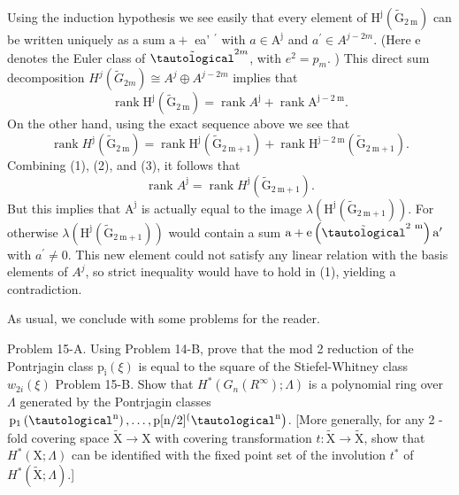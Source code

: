 \documentclass[10pt]{article}
\begin{document}
Using the induction hypothesis we see easily that every element of $\mathrm{H}^{\mathrm{j}}\left(\widetilde{\mathrm{G}}_{2 \mathrm{~m}}\right)$ can be written uniquely as a sum $\mathrm{a}+$ ea' $^{\prime}$ with $a \in \mathrm{A}^{\mathrm{j}}$ and $a^{\prime} \in A^{j-2 m}$. (Here e denotes the Euler class of $\tilde{\tautological}^{2 m}$, with $e^{2}=p_{m} .$ ) This direct sum decomposition $H^{j}\left(\widetilde{G}_{2 m}\right) \cong A^{j} \oplus A^{j-2 m}$ implies that
$$
\operatorname{rank} \mathrm{H}^{\mathrm{j}}\left(\widetilde{\mathrm{G}}_{2 \mathrm{~m}}\right)=\operatorname{rank} A^{\mathrm{j}}+\operatorname{rank} \mathrm{A}^{\mathrm{j}-2 \mathrm{~m}} .
$$
On the other hand, using the exact sequence above we see that
$$
\operatorname{rank} H^{\mathrm{j}}\left(\widetilde{\mathrm{G}}_{2 \mathrm{~m}}\right)=\operatorname{rank} \mathrm{H}^{\mathrm{j}}\left(\widetilde{\mathrm{G}}_{2 \mathrm{~m}+1}\right)+\operatorname{rank} \mathrm{H}^{\mathrm{j}-2 \mathrm{~m}}\left(\widetilde{\mathrm{G}}_{2 \mathrm{~m}+1}\right) .
$$
Combining (1), (2), and (3), it follows that
$$
\operatorname{rank} A^{\mathrm{j}}=\operatorname{rank} H^{\mathrm{j}}\left(\widetilde{\mathrm{G}}_{2 \mathrm{~m}+1}\right) .
$$
But this implies that $\mathrm{A}^{\mathrm{j}}$ is actually equal to the image $\lambda\left(\mathrm{H}^{\mathrm{j}}\left(\tilde{\mathrm{G}}_{2 \mathrm{~m}+1}\right)\right)$. For otherwise $\lambda\left(\mathrm{H}^{\mathrm{j}}\left(\widetilde{\mathrm{G}}_{2 \mathrm{~m}+1}\right)\right)$ would contain a sum $\mathrm{a}+\mathrm{e}\left(\tilde{\tautological}^{2 \mathrm{~m}}\right) \mathrm{a}^{\prime}$ with $a^{\prime} \neq 0$. This new element could not satisfy any linear relation with the basis elements of $A^{j}$, so strict inequality would have to hold in (1), yielding a contradiction.

As usual, we conclude with some problems for the reader.

Problem 15-A. Using Problem 14-B, prove that the mod 2 reduction of the Pontrjagin class $\mathrm{p}_{\mathrm{i}}(\xi)$ is equal to the square of the Stiefel-Whitney class $w_{2 i}(\xi)$ Problem 15-B. Show that $H^{*}\left(G_{n}\left(R^{\infty}\right) ; \Lambda\right)$ is a polynomial ring over $\Lambda$ generated by the Pontrjagin classes $\left.\mathrm{p}_{1}\left(\tautological^{\mathrm{n}}\right), \ldots, \mathrm{p}[\mathrm{n} / 2]{ }^{(} \tautological^{\mathrm{n}}\right)$. [More generally, for any 2 -fold covering space $\widetilde{\mathrm{X}} \rightarrow \mathrm{X}$ with covering transformation $t: \widetilde{\mathrm{X}} \rightarrow \widetilde{\mathrm{X}}$, show that $H^{*}(\mathrm{X} ; \Lambda)$ can be identified with the fixed point set of the involution $t^{*}$ of $H^{*}(\widetilde{\mathrm{X}} ; \Lambda)$.]
\end{document}
